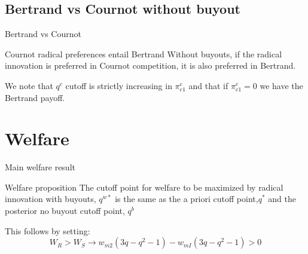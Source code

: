 \documentclass{beamer}
\begin{document}
\subsection{Bertrand vs Cournot without buyout}
\begin{frame}{Bertrand vs Cournot}
\begin{block}{Cournot radical preferences entail Bertrand}
Without buyouts, if the radical innovation is preferred in Cournot competition, it is also preferred in Bertrand. 
\end{block}
We note that $q^c$ cutoff is strictly increasing in $\pi_{e1}^{c}$ and that if $\pi_{e1}^{c}=0$ we have the Bertrand payoff.
\end{frame}

\section{Welfare}

\begin{frame}{Main welfare result}
\begin{block}{Welfare proposition}
The cutoff point for welfare to be maximized by radical innovation with buyouts, $q^{w*}$ is the same as the a priori cutoff point,$q^{*}$ and the posterior no buyout cutoff point, $q^{b}$
\end{block}
This follows by setting: 
\begin{equation*}
W_R> W_S \rightarrow  w_{m2}(3q-q^2-1)-w_{mI}(3q-q^2-1)>0
\end{equation*}
\end{frame}
\end{document}
